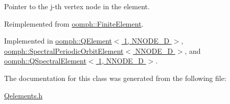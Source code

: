 Pointer to the j-\/th vertex node in the element. 



Reimplemented from \hyperlink{classoomph_1_1FiniteElement_a863c4382c879a77ad5607c6f9781c761}{oomph\+::\+Finite\+Element}.



Implemented in \hyperlink{classoomph_1_1QElement_3_011_00_01NNODE__1D_01_4_ab6e699d62c9c1208b8e2726f5d236a20}{oomph\+::\+Q\+Element$<$ 1, N\+N\+O\+D\+E\+\_\+D $>$}, \hyperlink{classoomph_1_1SpectralPeriodicOrbitElement_a1bcd63d9abbf001bf4beb903a18dfc2e}{oomph\+::\+Spectral\+Periodic\+Orbit\+Element$<$ N\+N\+O\+D\+E\+\_\+D $>$}, and \hyperlink{classoomph_1_1QSpectralElement_3_011_00_01NNODE__1D_01_4_a6106b1fc74eeab6848f3b03dba512f09}{oomph\+::\+Q\+Spectral\+Element$<$ 1, N\+N\+O\+D\+E\+\_\+D $>$}.



The documentation for this class was generated from the following file\+:\begin{DoxyCompactItemize}
\item 
\hyperlink{Qelements_8h}{Qelements.\+h}\end{DoxyCompactItemize}
